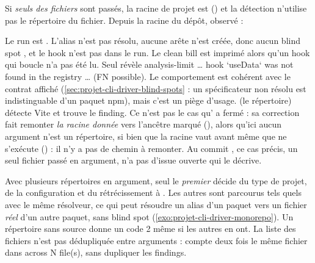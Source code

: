 \begin{piege}
Si \emph{seuls des fichiers} sont passés, la racine de projet est  () et la détection n'utilise pas le répertoire du fichier. Depuis la racine du dépôt, observé :
Le run est . L'alias  n'est pas résolu, aucune arête n'est créée, donc aucun blind spot , et le hook n'est pas dans le run. Le clean bill est imprimé alors qu'un hook qui boucle n'a pas été lu. Seul  révèle \og analysis-limit … hook `useData` was not found in the registry … (FN possible)\fg{}. Le comportement est cohérent avec le contrat affiché (\cref{sec:projet-cli-driver-blind-spots} : un spécificateur non résolu est indistinguable d'un paquet npm), mais c'est un piège d'usage.  (le répertoire) détecte Vite et trouve le finding. Ce n'est pas le cas qu' a fermé : sa correction fait remonter \emph{la racine donnée} vers l'ancêtre marqué (), alors qu'ici aucun argument n'est un répertoire, si bien que la racine vaut  avant même que  ne s'exécute () : il n'y a pas de chemin à remonter. Au commit \snapshotCommit, ce cas précis, un seul fichier passé en argument, n'a pas d'issue ouverte qui le décrive.
\end{piege}

\begin{piege}
Avec plusieurs répertoires en argument, seul le \emph{premier} décide du type de projet, de la configuration et du rétrécissement à . Les autres sont parcourus tels quels avec le même résolveur, ce qui peut résoudre un alias d'un paquet vers un fichier \emph{réel} d'un autre paquet, sans blind spot (\cref{exo:projet-cli-driver-monorepo}). Un répertoire sans source donne un code 2 même si les autres en ont. La liste des fichiers n'est pas dédupliquée entre arguments :  compte deux fois le même fichier dans \og across N file(s)\fg{}, sans dupliquer les findings.
\end{piege}

